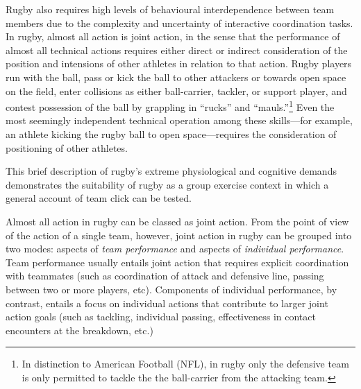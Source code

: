 \begin{CJK}{UTF8}{gbsn}
Rugby also requires high levels of behavioural interdependence between team members due to the complexity and uncertainty of interactive coordination tasks. In rugby, almost all action is joint action, in the sense that the performance of almost all technical actions requires either direct or indirect consideration of the position and intensions of other athletes in relation to that action.  Rugby players run with the ball, pass or kick the ball to other attackers or towards open space on the field, enter collisions as either ball-carrier, tackler, or support player, and contest possession of the ball by grappling in ``rucks'' and ``mauls.''\footnote{In distinction to American Football (NFL), in rugby only the defensive team is only permitted to tackle the the ball-carrier from the attacking team.}  Even the most seemingly independent technical operation among these skills---for example, an athlete kicking the rugby ball to open space---requires the consideration of positioning of other athletes.

This brief description of rugby's extreme physiological and cognitive demands demonstrates the suitability of rugby as a group exercise context in which a general account of team click can be tested.




Almost all action in rugby can be classed as joint action.  From the point of view of the action of a single team, however, joint action in rugby can be grouped into two modes: aspects of \textit{team performance} and aspects of \textit{individual performance}.  Team performance usually entails joint action that requires explicit coordination with teammates (such as coordination of attack and defensive line, passing between two or more players, etc).  Components of individual performance, by contrast, entails a focus on individual actions that contribute to larger joint action goals (such as tackling, individual passing, effectiveness in contact encounters at the breakdown, etc.)




\end{CJK}

